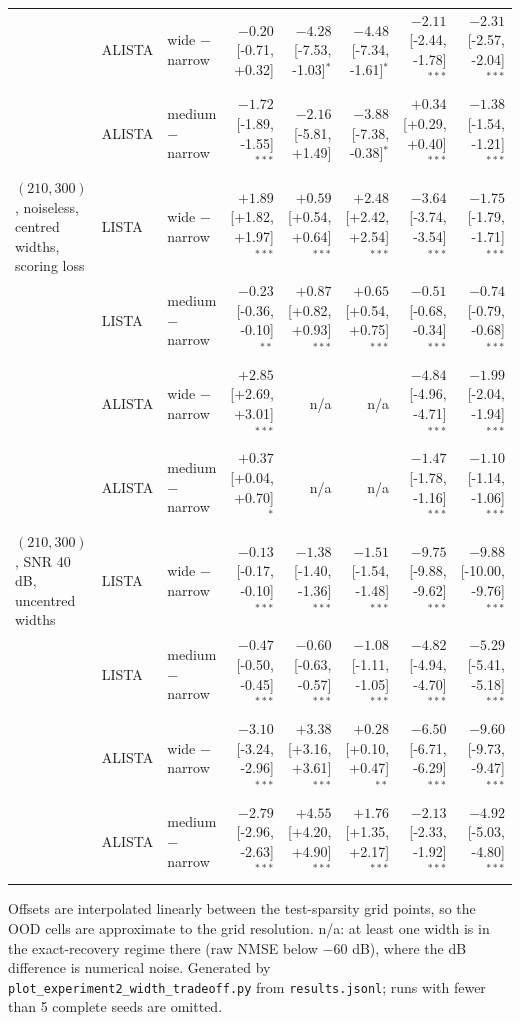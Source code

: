 \begin{table}[htbp]
\begin{tabular}{@{} l l l r rr rr @{}}
 & ALISTA & wide $-$ narrow & $-0.20$ [-0.71, +0.32] & $-4.28$ [-7.53, -1.03]$^{*}$ & $-4.48$ [-7.34, -1.61]$^{*}$ & $-2.11$ [-2.44, -1.78]$^{***}$ & $-2.31$ [-2.57, -2.04]$^{***}$ \\
 & ALISTA & medium $-$ narrow & $-1.72$ [-1.89, -1.55]$^{***}$ & $-2.16$ [-5.81, +1.49] & $-3.88$ [-7.38, -0.38]$^{*}$ & $+0.34$ [+0.29, +0.40]$^{***}$ & $-1.38$ [-1.54, -1.21]$^{***}$ \\
\addlinespace
$(210,300)$, noiseless, centred widths, scoring loss & LISTA & wide $-$ narrow & $+1.89$ [+1.82, +1.97]$^{***}$ & $+0.59$ [+0.54, +0.64]$^{***}$ & $+2.48$ [+2.42, +2.54]$^{***}$ & $-3.64$ [-3.74, -3.54]$^{***}$ & $-1.75$ [-1.79, -1.71]$^{***}$ \\
 & LISTA & medium $-$ narrow & $-0.23$ [-0.36, -0.10]$^{**}$ & $+0.87$ [+0.82, +0.93]$^{***}$ & $+0.65$ [+0.54, +0.75]$^{***}$ & $-0.51$ [-0.68, -0.34]$^{***}$ & $-0.74$ [-0.79, -0.68]$^{***}$ \\
 & ALISTA & wide $-$ narrow & $+2.85$ [+2.69, +3.01]$^{***}$ & n/a & n/a & $-4.84$ [-4.96, -4.71]$^{***}$ & $-1.99$ [-2.04, -1.94]$^{***}$ \\
 & ALISTA & medium $-$ narrow & $+0.37$ [+0.04, +0.70]$^{*}$ & n/a & n/a & $-1.47$ [-1.78, -1.16]$^{***}$ & $-1.10$ [-1.14, -1.06]$^{***}$ \\
\addlinespace
$(210,300)$, SNR 40 dB, uncentred widths & LISTA & wide $-$ narrow & $-0.13$ [-0.17, -0.10]$^{***}$ & $-1.38$ [-1.40, -1.36]$^{***}$ & $-1.51$ [-1.54, -1.48]$^{***}$ & $-9.75$ [-9.88, -9.62]$^{***}$ & $-9.88$ [-10.00, -9.76]$^{***}$ \\
 & LISTA & medium $-$ narrow & $-0.47$ [-0.50, -0.45]$^{***}$ & $-0.60$ [-0.63, -0.57]$^{***}$ & $-1.08$ [-1.11, -1.05]$^{***}$ & $-4.82$ [-4.94, -4.70]$^{***}$ & $-5.29$ [-5.41, -5.18]$^{***}$ \\
 & ALISTA & wide $-$ narrow & $-3.10$ [-3.24, -2.96]$^{***}$ & $+3.38$ [+3.16, +3.61]$^{***}$ & $+0.28$ [+0.10, +0.47]$^{**}$ & $-6.50$ [-6.71, -6.29]$^{***}$ & $-9.60$ [-9.73, -9.47]$^{***}$ \\
 & ALISTA & medium $-$ narrow & $-2.79$ [-2.96, -2.63]$^{***}$ & $+4.55$ [+4.20, +4.90]$^{***}$ & $+1.76$ [+1.35, +2.17]$^{***}$ & $-2.13$ [-2.33, -1.92]$^{***}$ & $-4.92$ [-5.03, -4.80]$^{***}$ \\
\bottomrule
\end{tabular}
\vspace{2pt}
\begin{minipage}{\linewidth}\footnotesize
Offsets are interpolated linearly between the test-sparsity grid points, so the OOD cells are approximate to the grid resolution. n/a: at least one width is in the exact-recovery regime there (raw NMSE below $-60$ dB), where the dB difference is numerical noise. Generated by \texttt{plot\_experiment2\_width\_tradeoff.py} from \texttt{results.jsonl}; runs with fewer than 5 complete seeds are omitted.
\end{minipage}
\end{table}
